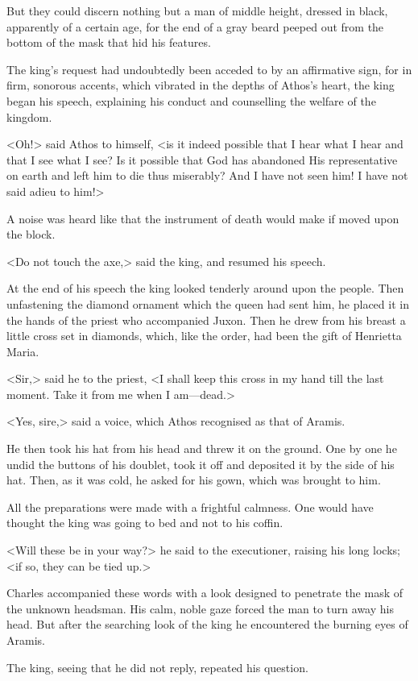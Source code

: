 But they could discern nothing but a man of middle height, dressed in black, apparently of a certain age, for the end of a gray beard peeped out from the bottom of the mask that hid his features.

The king's request had undoubtedly been acceded to by an affirmative sign, for in firm, sonorous accents, which vibrated in the depths of Athos's heart, the king began his speech, explaining his conduct and counselling the welfare of the kingdom.

<Oh!> said Athos to himself, <is it indeed possible that I hear what I hear and that I see what I see? Is it possible that God has abandoned His representative on earth and left him to die thus miserably? And I have not seen him! I have not said adieu to him!>

A noise was heard like that the instrument of death would make if moved upon the block.

<Do not touch the axe,> said the king, and resumed his speech.

At the end of his speech the king looked tenderly around upon the people. Then unfastening the diamond ornament which the queen had sent him, he placed it in the hands of the priest who accompanied Juxon. Then he drew from his breast a little cross set in diamonds, which, like the order, had been the gift of Henrietta Maria.

<Sir,> said he to the priest, <I shall keep this cross in my hand till the last moment. Take it from me when I am—dead.>

<Yes, sire,> said a voice, which Athos recognised as that of Aramis.

He then took his hat from his head and threw it on the ground. One by one he undid the buttons of his doublet, took it off and deposited it by the side of his hat. Then, as it was cold, he asked for his gown, which was brought to him.

All the preparations were made with a frightful calmness. One would have thought the king was going to bed and not to his coffin.

<Will these be in your way?> he said to the executioner, raising his long locks; <if so, they can be tied up.>

Charles accompanied these words with a look designed to penetrate the mask of the unknown headsman. His calm, noble gaze forced the man to turn away his head. But after the searching look of the king he encountered the burning eyes of Aramis.

The king, seeing that he did not reply, repeated his question.

